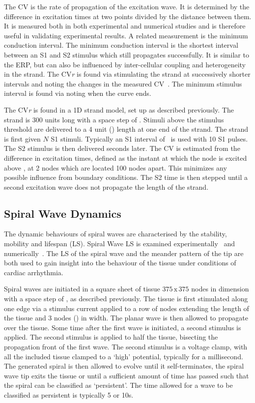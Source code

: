 The CV is the rate of propagation of the excitation wave.
It is determined by the difference in excitation times at two points divided by
the distance between them.
It is measured both in both experimental and numerical studies and is therefore
useful in validating experimental results.
A related measurement is the minimum conduction interval.
The minimum conduction interval is the shortest interval between an S1 and S2
stimulus which still propagates successfully.
It is similar to the ERP, but can also be influenced by inter-cellular coupling
and heterogeneity in the strand.
The CV\emph{r} is found via stimulating the strand at successively shorter
intervals and noting the changes in the measured
CV~\cite{Cherry2008,Zhang2003,Qu2006}.
The minimum stimulus interval is found via noting when the curve ends.


The CV\emph{r} is found in a 1D strand model, set up as described previously.
The strand is 300 units long with a space step of .
Stimuli above the stimulus threshold are delivered to a 4 unit () length
at one end of the strand.
The strand is first given $N$ S1 stimuli.
Typically an S1 interval of \ is used with 10 S1 pulses.
The S2 stimulus is then delivered  seconds later.
The CV is estimated from the difference in excitation times, defined as the
instant at which the node is excited above , at 2 nodes which are
located 100 nodes apart.
This minimizes any possible influence from boundary conditions.
The S2 time is then stepped until a second excitation wave
does not propagate the length of the strand.


\subsection{Spiral Wave Dynamics}

The dynamic behaviours of spiral waves are characterised by the stability,
mobility and lifespan (LS).
Spiral Wave LS is examined experimentally~\cite{Kumagai1997} and
numerically~\cite{Qu2000,Nygren2001,Cherry2007,Clayton2005,Zhang2003}.
The LS of the spiral wave and the meander pattern of the tip are both used to
gain insight into the behaviour of the tissue under conditions of cardiac
arrhythmia.

Spiral waves are initiated in a square sheet of tissue $375\,\text{x}\,375$
nodes in dimension with a space step of , as described previously.  The
tissue is first stimulated along one edge via a stimulus current applied to a
row of nodes extending the length of the tissue and 3 nodes () in width.
The planar wave is then allowed to propagate over the tissue.  Some time after
the first wave is initiated, a second stimulus is applied.  The second stimulus
is applied to half the tissue, bisecting the propagation front of the first wave.
The second stimulus is a voltage clamp, with all the included tissue clamped to
a `high' potential, typically  for a millisecond.  The
generated spiral is then allowed to evolve until it self-terminates, the spiral
wave tip exits the tissue or until a sufficient amount of time has passed such
that the spiral can be classified as `persistent'.  The time allowed for a wave
to be classified as persistent is typically 5 or \unit{10}{s}.

